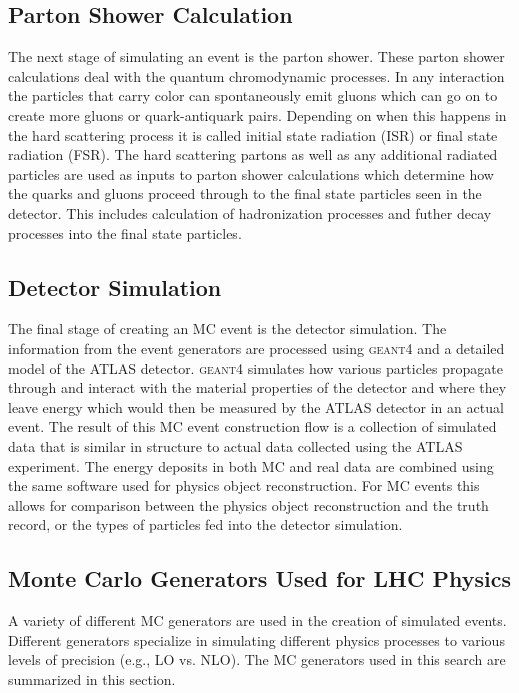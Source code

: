 \subsection{Parton Shower Calculation}
The next stage of simulating an event is the parton shower.  These parton shower calculations deal with the quantum chromodynamic processes.  In any interaction the particles that carry color can spontaneously emit gluons which can go on to create more gluons or quark-antiquark pairs.  Depending on when this happens in the hard scattering process it is called initial state radiation (ISR) or final state radiation (FSR).   The hard scattering partons as well as any additional radiated particles are used as inputs to parton shower calculations which determine how the quarks and gluons proceed through to the final state particles seen in the detector.  This includes calculation of hadronization processes and futher decay processes into the final state particles.

\subsection{Detector Simulation}
The final stage of creating an MC event is the detector simulation.  The information from the event generators are processed using \textsc{geant4}\cite{Geant4} and a detailed model of the ATLAS detector.  \textsc{geant4} simulates how various particles propagate through and interact with the material properties of the detector and where they leave energy which would then be measured by the ATLAS detector in an actual event.  The result of this MC event construction flow is a collection of simulated data that is similar in structure to actual data collected using the ATLAS experiment.  The energy deposits in both MC and real data are combined using the same software used for physics object reconstruction.  For MC events this allows for comparison between the physics object reconstruction and the truth record, or the types of particles fed into the detector simulation.

\subsection{Monte Carlo Generators Used for LHC Physics}

A variety of different MC generators are used in the creation of simulated events.  Different generators specialize in simulating different physics processes to various levels of precision (e.g., LO vs. NLO). The MC generators used in this search are summarized in this section.

